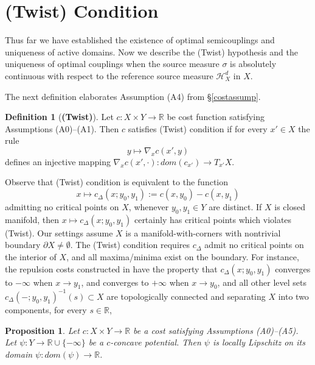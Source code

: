 \documentclass[12pt]{amsart}
\newtheorem{prop}{Proposition}
\theoremstyle{definition}
\newtheorem{dfn}{Definition}
\theoremstyle{remark}
\newcommand{\bR}{\mathbb{R}}
\newcommand{\del}{\partial}
\newcommand{\cd}{c_\Delta}
\begin{document}




\section{(Twist) Condition}\label{uos}
Thus far we have established the existence of optimal semicouplings and uniqueness of active domains. Now we describe the (Twist) hypothesis and the uniqueness of optimal couplings when the source measure $\sigma$ is absolutely continuous with respect to the reference source measure $\mathscr{H}_X^d$ in $X$. 

The next definition elaborates Assumption (A4) from \S \ref{costassump}.
\begin{dfn}[\textbf{(Twist)}]\label{twistdef}
Let $c: X\times Y \to \bR$ be cost function satisfying Assumptions (A0)--(A1). Then $c$ satisfies (Twist) condition if for every $x'\in X$ the rule $$y\mapsto \nabla_x c(x',y) $$ defines an injective mapping $\nabla_x c(x',\cdot):dom(c_{x'})\to T_{x'} X$. 
\end{dfn}

Observe that (Twist) condition is equivalent to the function $$x\mapsto \cd(x;y_0, y_1):=c(x,y_0)-c(x,y_1)$$ admitting no critical points on $X$, whenever $y_0, y_1 \in Y$ are distinct. If $X$ is closed manifold, then $x\mapsto \cd(x;y_0,y_1)$ certainly has critical points which violates (Twist). Our settings assume $X$ is a manifold-with-corners with nontrivial boundary $\del X \neq \emptyset$. The (Twist) condition requires $\cd$ admit no critical points on the interior of $X$, and all maxima/minima exist on the boundary. For instance, the repulsion costs constructed in \cite{martel} have the property that $\cd(x;y_0,y_1)$ converges to $-\infty$ when $x\to y_1$, and converges to $+\infty$ when $x\to y_0$, and all other level sets $\cd(-;y_0,y_1)^{-1}(s) \subset X$ are topologically connected and separating $X$ into two components, for every $s\in \bR$,  


\begin{prop}\label{lipsi}
Let $c: X\times Y \to \bR$ be a cost satisfying Assumptions (A0)--(A5). Let $\psi: Y\to \bR \cup \{-\infty\}$ be a $c$-concave potential. Then $\psi$ is locally Lipschitz on its domain $\psi: dom(\psi) \to \bR$. 
\end{prop}
\end{document}
